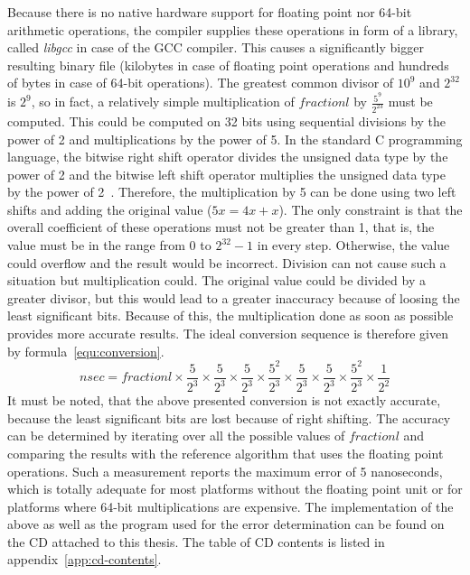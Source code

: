 Because there is no native hardware support for floating point nor 64-bit arithmetic operations,
the compiler supplies these operations in form of a library, called {\it{libgcc}} in case of the GCC compiler.
This causes a significantly bigger resulting binary file
(kilobytes in case of floating point operations and hundreds of bytes in case of 64-bit operations).
The greatest common divisor of $10^9$ and $2^{32}$ is $2^9$,
so in fact, a relatively simple multiplication of $fractionl$ by $\frac{5^9}{2^{23}}$ must be computed.
This could be computed on 32 bits using sequential
divisions by the power of 2 and multiplications by the power of 5.
In the standard C programming language, the bitwise right shift operator divides the unsigned data type by the power of 2
and the bitwise left shift operator multiplies the unsigned data type by the power of 2~\cite{c99}.
Therefore, the multiplication by 5 can be done using two left shifts and
adding the original value ($5x = 4x + x$).
The only constraint is that the overall coefficient of these operations must not be greater than 1,
that is, the value must be in the range from $0$ to $2^{32}-1$ in every step.
Otherwise, the value could overflow and the result would be incorrect.
Division can not cause such a situation but multiplication could.
The original value could be divided by a greater divisor,
but this would lead to a greater inaccuracy because of loosing the least significant bits.
Because of this, the multiplication done as soon as possible provides more accurate results.
The ideal conversion sequence is therefore given by formula~\ref{equ:conversion}.
\begin{equation}
\label{equ:conversion}
nsec = fractionl \times \frac{5}{2^3} \times \frac{5}{2^3} \times \frac{5}{2^3} \times \frac{5^2}{2^3} \times \frac{5}{2^3}  \times \frac{5}{2^3} \times \frac{5^2}{2^3} \times \frac{1}{2^2}
\end{equation}
It must be noted, that the above presented conversion is not exactly accurate,
because the least significant bits are lost because of right shifting.
The accuracy can be determined by iterating over all the possible values of $fractionl$
and comparing the results with the reference algorithm that uses the floating point operations.
Such a measurement reports the maximum error of 5 nanoseconds,
which is totally adequate for most platforms without the floating point unit or
for platforms where 64-bit multiplications are expensive.
The implementation of the above as well as the program used for the
error determination can be found on the CD attached to this thesis.
The table of CD contents is listed in appendix~\ref{app:cd-contents}.

